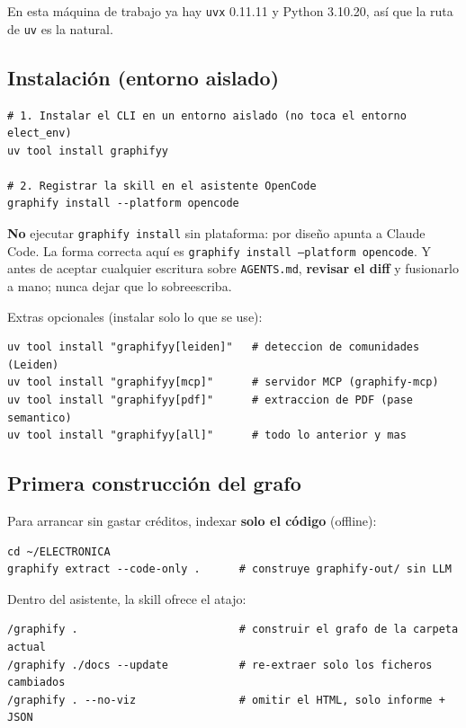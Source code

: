 \documentclass[11pt,a4paper]{article}
\begin{document}
En esta máquina de trabajo ya hay \texttt{uvx} 0.11.11 y Python 3.10.20, así que la ruta
de \texttt{uv} es la natural.

\subsection{Instalación (entorno aislado)}

\begin{lstlisting}
# 1. Instalar el CLI en un entorno aislado (no toca el entorno elect_env)
uv tool install graphifyy

# 2. Registrar la skill en el asistente OpenCode
graphify install --platform opencode
\end{lstlisting}

\begin{tcolorbox}[cajaMejora, title={\faIcon{exclamation-triangle}~No dejar que reescriba \texttt{AGENTS.md}}]
\textbf{No} ejecutar \texttt{graphify install} sin plataforma: por diseño apunta a
Claude Code. La forma correcta aquí es \texttt{graphify install --platform opencode}. Y
antes de aceptar cualquier escritura sobre \texttt{AGENTS.md}, \textbf{revisar el diff}
y fusionarlo a mano; nunca dejar que lo sobreescriba.
\end{tcolorbox}

Extras opcionales (instalar solo lo que se use):

\begin{lstlisting}
uv tool install "graphifyy[leiden]"   # deteccion de comunidades (Leiden)
uv tool install "graphifyy[mcp]"      # servidor MCP (graphify-mcp)
uv tool install "graphifyy[pdf]"      # extraccion de PDF (pase semantico)
uv tool install "graphifyy[all]"      # todo lo anterior y mas
\end{lstlisting}

\subsection{Primera construcción del grafo}

Para arrancar sin gastar créditos, indexar \textbf{solo el código} (offline):

\begin{lstlisting}
cd ~/ELECTRONICA
graphify extract --code-only .      # construye graphify-out/ sin LLM
\end{lstlisting}

Dentro del asistente, la skill ofrece el atajo:

\begin{lstlisting}
/graphify .                         # construir el grafo de la carpeta actual
/graphify ./docs --update           # re-extraer solo los ficheros cambiados
/graphify . --no-viz                # omitir el HTML, solo informe + JSON
\end{lstlisting}
\end{document}
